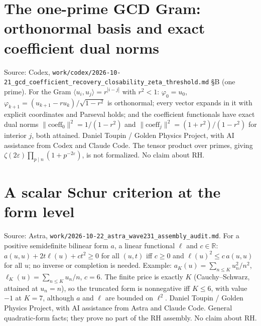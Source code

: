 \documentclass{report}
\theoremstyle{definition}
\begin{document}
\begin{itemize}
\begin{itemize}
\section{The one-prime GCD Gram: orthonormal basis and exact coefficient dual norms}
Source: Codex, \texttt{work/codex/2026-10-21\_gcd\_coefficient\_recovery\_closability\_zeta\_threshold.md} \S B (one prime). For the Gram
$\langle u_i,u_j\rangle=r^{|i-j|}$ with $r^2<1$: $\varphi_0=u_0$, $\varphi_{k+1}=(u_{k+1}-ru_k)/\sqrt{1-r^2}$ is orthonormal; every vector expands in it with
explicit coordinates and Parseval holds; and the coefficient functionals have exact dual norms $\|\mathrm{coeff}_0\|^2=1/(1-r^2)$ and
$\|\mathrm{coeff}_j\|^2=(1+r^2)/(1-r^2)$ for interior $j$, both attained. Daniel Toupin / Golden Physics Project, with AI assistance from Codex and
Claude Code. The tensor product over primes, giving $\zeta(2\varepsilon)\prod_{p\mid n}(1+p^{-2\varepsilon})$, is not formalized. No claim about RH.

\section{A scalar Schur criterion at the form level}
Source: Astra, \texttt{work/2026-10-22\_astra\_wave231\_assembly\_audit.md}. For a positive semidefinite bilinear form $a$, a linear functional $\ell$
and $c\in\mathbb R$: $a(u,u)+2t\ell(u)+ct^2\ge0$ for all $(u,t)$ iff $c\ge0$ and $\ell(u)^2\le c\,a(u,u)$ for all $u$; no inverse or completion is needed.
Example: $a_K(u)=\sum_{n\le K}u_n^2/n^2$, $\ell_K(u)=\sum_{n\le K}u_n/n$, $c=6$. The finite price is exactly $K$ (Cauchy--Schwarz, attained at $u_n=n$),
so the truncated form is nonnegative iff $K\le6$, with value $-1$ at $K=7$, although $a$ and $\ell$ are bounded on $\ell^2$. Daniel Toupin / Golden
Physics Project, with AI assistance from Astra and Claude Code. General quadratic-form facts; they prove no part of the RH assembly. No claim about RH.


\end{itemize}
\end{itemize}
\end{document}

